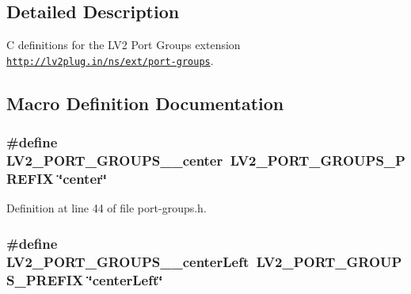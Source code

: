 \subsection{Detailed Description}
C definitions for the L\+V2 Port Groups extension \href{http://lv2plug.in/ns/ext/port-groups}{\tt http\+://lv2plug.\+in/ns/ext/port-\/groups}. 

\subsection{Macro Definition Documentation}
\subsubsection[{\texorpdfstring{L\+V2\+\_\+\+P\+O\+R\+T\+\_\+\+G\+R\+O\+U\+P\+S\+\_\+\+\_\+center}{LV2_PORT_GROUPS__center}}]{\setlength{\rightskip}{0pt plus 5cm}\#define L\+V2\+\_\+\+P\+O\+R\+T\+\_\+\+G\+R\+O\+U\+P\+S\+\_\+\+\_\+center~{\bf L\+V2\+\_\+\+P\+O\+R\+T\+\_\+\+G\+R\+O\+U\+P\+S\+\_\+\+P\+R\+E\+F\+IX} \char`\"{}center\char`\"{}}\hypertarget{port-groups_8h_a450c05b5a6ddc1d865b01d120e463bb9}{}\label{port-groups_8h_a450c05b5a6ddc1d865b01d120e463bb9}


Definition at line 44 of file port-\/groups.\+h.

\subsubsection[{\texorpdfstring{L\+V2\+\_\+\+P\+O\+R\+T\+\_\+\+G\+R\+O\+U\+P\+S\+\_\+\+\_\+center\+Left}{LV2_PORT_GROUPS__centerLeft}}]{\setlength{\rightskip}{0pt plus 5cm}\#define L\+V2\+\_\+\+P\+O\+R\+T\+\_\+\+G\+R\+O\+U\+P\+S\+\_\+\+\_\+center\+Left~{\bf L\+V2\+\_\+\+P\+O\+R\+T\+\_\+\+G\+R\+O\+U\+P\+S\+\_\+\+P\+R\+E\+F\+IX} \char`\"{}center\+Left\char`\"{}}\hypertarget{port-groups_8h_a8c0cc42d288e37fd75e46a6a500d8c1a}{}\label{port-groups_8h_a8c0cc42d288e37fd75e46a6a500d8c1a}


